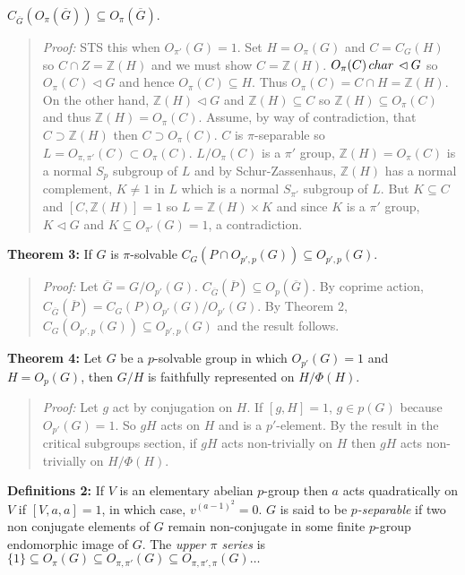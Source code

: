 $C_{\overline G}(O_{\pi}({\overline G})) \subseteq O_{\pi}({\overline G})$.
\begin{quote}
\emph{Proof:}  
STS this when
$O_{\pi'}( G ) = 1$.  Set $H= O_{\pi}(G)$ and $C= C_G(H)$ so $C \cap Z = {\mathbb Z}(H)$ and
we must show $C= {\mathbb Z}(H)$.  $O_{\pi}(C) \thinspace char \thinspace \lhd G$ so
$O_{\pi}(C) \lhd G$ and hence
$O_{\pi}(C) \subseteq H$.  Thus $O_{\pi}(C)= C \cap H = {\mathbb Z}(H)$.  On the other hand,
${\mathbb Z}(H) \lhd G$ and
${\mathbb Z}(H) \subseteq C$ so
${\mathbb Z}(H) \subseteq O_{\pi}(C)$ and thus
${\mathbb Z}(H) = O_{\pi}(C)$.
Assume, by way of contradiction, that $C \supset {\mathbb Z}(H)$ then
$C \supset O_{\pi}(C)$.  $C$ is $\pi$-separable so
$L= O_{\pi, \pi'}(C) \subset O_{\pi}(C)$.  $L/O_{\pi}(C)$ is a $\pi'$ group, 
${\mathbb Z}(H)= O_{\pi}(C)$ is a normal $S_p$ subgroup of $L$ and by Schur-Zassenhaus,
${\mathbb Z}(H)$ has a normal complement, $K \ne 1$ in $L$ which is a normal $S_{\pi'}$
subgroup of $L$.  But $K \subseteq C$ and $[C, {\mathbb Z}(H)]=1$ so
$L= {\mathbb Z}(H) \times K$ and since $K$ is a $\pi'$ group, $K \lhd G$ and
$K \subseteq O_{\pi'}(G)= 1$, a contradiction.
\end{quote}
{\bf Theorem 3:}
If $G$ is $\pi$-solvable 
$C_G(P \cap O_{p', p}(G)) \subseteq O_{p', p}(G)$.
\begin{quote}
\emph{Proof:}  
Let ${\overline G} = G/O_{p'}(G)$.  $C_{\overline G}({\overline P}) \subseteq  O_{p}({\overline G})$.
By coprime action, $C_{\overline G}({\overline P}) = C_G(P) O_{p'}(G)/O_{p'}(G)$.  By Theorem 2,
$C_G(O_{p',p}(G)) \subseteq O_{p',p}(G)$ and the result follows.
\end{quote}
{\bf Theorem 4:}
Let $G$ be a $p$-solvable group in which $O_{p'}(G)= 1$ and $H= O_p(G)$, then
$G/H$ is faithfully represented on $H/\Phi(H)$.
\begin{quote}
\emph{Proof:}  
Let $g$ act by conjugation on $H$. 
If $[g, H]=1$, $g \in p(G)$ because $O_{p'}(G)=1$.  So $gH$ acts on $H$ and is a $p'$-element.
By the result in the critical subgroups section, if $gH$ acts non-trivially on $H$ then
$gH$ acts non-trivially on $H/\Phi(H)$.
\end{quote}
{\bf Definitions 2:} If $V$ is an elementary abelian $p$-group then $a$ 
acts quadratically on $V$ if $[V,a,a]=1$, in which  case, $v^{(a-1)^2}=0$.
$G$ is said to be 
\emph{$p$-separable} if two non conjugate elements of $G$ remain non-conjugate in 
some finite $p$-group endomorphic image of $G$.
The \emph{upper $\pi$ series}  is
$\{ 1 \} \subseteq O_{\pi}(G) \subseteq O_{\pi, \pi'}(G) \subseteq O_{\pi, \pi', \pi}(G) \ldots$
